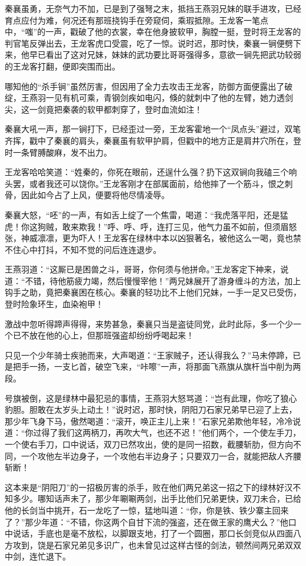 \documentclass[12pt,oneside]{book}
\begin{document}
秦襄虽勇，无奈气力不加，已是到了强弩之末，抵挡王燕羽兄妹的联手进攻，已经育点应付为难，何况还有那班挠钩手在旁窥伺，乘瑕抵隙。王龙客一笔点中，``嗤''的一声，戳破了他的衣裳，幸在他身披软甲，胸膛一挺，登时将王龙客的判官笔反弹出去，王龙客虎口受震，吃了一惊。说时迟，那时快，秦襄一锏便劈下来，他早已看出了这对兄妹，妹妹的武功要比哥哥强得多，意欲一锏先把武功较弱的王龙客打翻，便即突围而出。

哪知他的``杀手锏''虽然厉害，但因用了全力去攻击王龙客，防御方面便露出了破绽，王燕羽一见有机可乘，青钢剑疾如电闪，倏的就刺中了他的左臂，她力透剑尖，这一剑竟把秦袭的软甲都刺穿了，登时血流如注！

秦襄大吼一声，那一锏打下，已经歪过一旁，王龙客霍地一个``凤点头''避过，双笔齐挥，戳中了秦襄的肩头，秦襄虽有软甲护肩，但戳中的地方正是肩井穴所在，登时一条臂膊酸麻，发不出力。

王龙客哈哈笑道：``姓秦的，你死在眼前，还逞什么强？扔下这双锏向我磕三个响头罢，或者我还可以饶你。''王龙客刚才在部属面前，给他摔了一个筋斗，恨之刺骨，因此如今占了上风，便要将他尽情凌辱。

秦襄大怒，``呸''的一声，有如舌上绽了一个焦雷，喝道：``我虎落平阳，还是猛虎！你这狗贼，敢来欺我！''呼、呼、呼，连打三见，他气力虽不如前，但须眉怒张，神威凛凛，更为吓人！王龙客在绿林中本以凶狠著名，被他这么一喝，竟也禁不住心中打抖，不知不觉的问后连连退步。

王燕羽道：``这厮已是困兽之斗，哥哥，你何须与他拼命。''王龙客定下神来，说道：``不错，待他筋疲力竭，然后慢慢宰他！''两兄妹展开了游身缠斗的方法，加上钩手之助，竟把秦襄困在核心。秦襄的轻功比不上他们兄妹，一手一足又已受伤，登时险象环生，血染袍甲！

激战中忽听得蹄声得得，来势甚急，秦襄只当是盗徒同党，此时此际，多一个少一个已不放在他的心上，但那班强盗却纷纷呼喝起来！

只见一个少年骑士疾驰而来，大声喝道：``王家贼子，还认得我么？''马未停蹄，已是把手一扬，一支匕首，破空飞来，``咔嚓''一声，将那面飞燕旗从旗杆当中削为两段。

号旗被倒，这是绿林中最犯忌的事情，王燕羽大怒骂道：``岂有此理，你吃了狼心豹胆。胆敢在太岁头上动土！''说时迟，那时快，阴阳刀石家兄弟早已迎了上去，那少年飞身下马，傲然喝道：``滚开，唤正主儿上来！''石家兄弟欺他年轻，冷冷说道：``你过得了我们这两柄刀，再吹大气，也还不迟！''他们两个，一个使左手刀，一个使右手刀，口中说话，双刀已然攻出，使的是同一招数，截腰斩肋，但方向不同，一个攻他左半边身子，一个攻他右半边身子；只要双刀一合，就能把敌人齐腰斩断！

这本来是``阴阳刀''的一招极厉害的杀手，败在他们两兄弟这一招之下的绿林好汉不知多少。哪知话声未了，那少年唰唰两剑，出手比他们兄弟更快，双刀未合，已给他的长剑当中挑开，石一龙吃了一惊，猛地叫道：``你，你是铁、铁少寨主回来了？''那少年道：``不错，你这两个自甘下流的强盗，还在做王家的鹰犬么？''他口中说话，手底也是毫不放松，以脚跟支地，打了一个圆圈，那口长剑竞似从四面八方攻到，饶是石家兄弟见多识广，也未曾见过这样古怪的剑法，顿然间两兄弟双双中剑，连忙退下。
\end{document}
